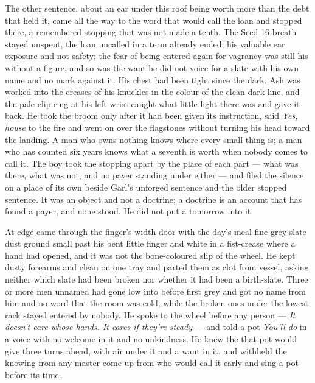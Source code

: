 The other sentence, about an ear under this roof being worth more than the debt that held it, came all the way to the word that would call the loan and stopped there, a remembered stopping that was not made a tenth. The Seed 16 breath stayed unspent, the loan uncalled in a term already ended, his valuable ear exposure and not safety; the fear of being entered again for vagrancy was still his without a figure, and so was the want he did not voice for a slate with his own name and no mark against it. His chest had been tight since the dark. Ash was worked into the creases of his knuckles in the colour of the clean dark line, and the pale clip-ring at his left wrist caught what little light there was and gave it back. He took the broom only after it had been given its instruction, said \emph{Yes, house} to the fire and went on over the flagstones without turning his head toward the landing. A man who owns nothing knows where every small thing is; a man who has counted six years knows what a seventh is worth when nobody comes to call it. The boy took the stopping apart by the place of each part --- what was there, what was not, and no payer standing under either --- and filed the silence on a place of its own beside Garl's unforged sentence and the older stopped sentence. It was an object and not a doctrine; a doctrine is an account that has found a payer, and none stood. He did not put a tomorrow into it.

At  edge  came through the finger's-width door with the day's meal-fine grey slate dust ground small past his bent little finger and white in a fist-crease where a hand had opened, and it was not the bone-coloured slip of the wheel. He kept dusty forearms and clean on one tray and parted them as clot from vessel, asking neither which slate had been broken nor whether it had been a birth-slate. Three or more men unnamed had gone low into  before first grey and got no name from him and no word that the room was cold, while the broken ones under the lowest rack stayed entered by nobody. He spoke to the wheel before any person --- \emph{It doesn't care whose hands. It cares if they're steady} --- and told a pot \emph{You'll do} in a voice with no welcome in it and no unkindness. He knew the  that pot would give three turns ahead, with air under it and a want in it, and withheld the knowing from any master come up from  who would call it early and sing a pot before its time.

